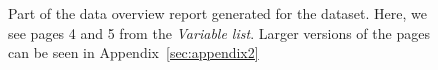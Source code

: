 \documentclass[article,shortnames]{jss}
\begin{document}
\begin{figure}[tb]
\begin{center}
\end{center}
\caption{Part of the data overview report generated for the  dataset. Here, we see pages 4 and 5 from the \textit{Variable list}. Larger versions of the pages can be seen in
  Appendix~\ref{sec:appendix2}}
\label{fig:bigExampleP45}
\end{figure}
\end{document}
